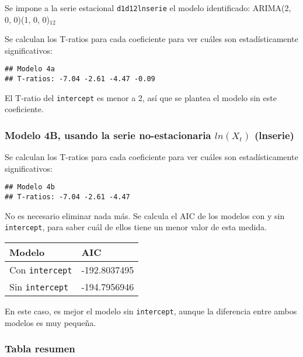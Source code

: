 \documentclass[
]{article}
\begin{document}
Se impone a la serie estacional \texttt{d1d12lnserie} el modelo
identificado: ARIMA(2, 0, 0)(1, 0, 0)\(_{12}\)

Se calculan los T-ratios para cada coeficiente para ver cuáles son
estadísticamente significativos:

\begin{verbatim}
## Modelo 4a 
## T-ratios: -7.04 -2.61 -4.47 -0.09
\end{verbatim}

El T-ratio del \texttt{intercept} es menor a 2, así que se plantea el
modelo sin este coeficiente.

\medskip

\hypertarget{modelo-4b-usando-la-serie-no-estacionaria-lnx_t-lnserie}{%
\subsubsection{\texorpdfstring{Modelo 4B, usando la serie
no-estacionaria \(ln(X_t)\)
(lnserie)}{Modelo 4B, usando la serie no-estacionaria ln(X\_t) (lnserie)}}\label{modelo-4b-usando-la-serie-no-estacionaria-lnx_t-lnserie}}

Se calculan los T-ratios para cada coeficiente para ver cuáles son
estadísticamente significativos:

\begin{verbatim}
## Modelo 4b 
## T-ratios: -7.04 -2.61 -4.47
\end{verbatim}

No es necesario eliminar nada más. Se calcula el AIC de los modelos con
y sin \texttt{intercept}, para saber cuál de ellos tiene un menor valor
de esta medida.

\begin{longtable}[]{@{}ll@{}}
\toprule()
Modelo & AIC \\
\midrule()
\endhead
Con \texttt{intercept} & -192.8037495 \\
Sin \texttt{intercept} & -194.7956946 \\
\bottomrule()
\end{longtable}

En este caso, es mejor el modelo sin \texttt{intercept}, aunque la
diferencia entre ambos modelos es muy pequeña.

\medskip

\hypertarget{tabla-resumen}{%
\subsubsection{Tabla resumen}\label{tabla-resumen}}
\end{document}
